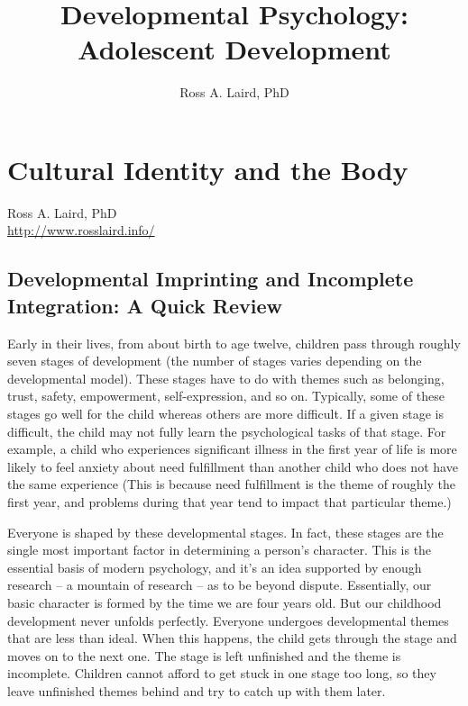 \documentclass[12pt,DIV9,oneside,headsepline,footsepline]{scrreprt}
\title{Developmental Psychology:\\Adolescent Development}
\author{Ross A. Laird, PhD}
\begin{document}

\pagestyle{empty}
\begin{center}
\maketitle
\end{center}
\tableofcontents
\pagestyle{scrheadings}
\chapter{Cultural Identity and the Body}
\begin{flushleft}
Ross A. Laird, PhD\\
\url{http://www.rosslaird.info/}
\end{flushleft}

\section{Developmental Imprinting and Incomplete Integration: A Quick
Review}

Early in their lives, from about birth to age twelve, children pass
through roughly seven stages of development (the number of stages
varies depending on the developmental model). These stages have to do
with themes such as belonging, trust, safety, empowerment,
self-expression, and so on. Typically, some of these stages go well
for the child whereas others are more difficult. If a given stage is
difficult, the child may not fully learn the psychological tasks of
that stage. For example, a child who experiences significant illness
in the first year of life is more likely to feel anxiety about need
fulfillment than another child who does not have the same experience
(This is because need fulfillment is the theme of roughly the first
year, and problems during that year tend to impact that particular
theme.)


Everyone is shaped by these developmental stages. In fact, these
stages are the single most important factor in determining a person's
character. This is the essential basis of modern psychology, and it's
an idea supported by enough research -- a mountain of research -- as
to be beyond dispute. Essentially, our basic character is formed by
the time we are four years old. But our childhood development never
unfolds perfectly. Everyone undergoes developmental themes that are
less than ideal. When this happens, the child gets through the stage
and moves on to the next one. The stage is left unfinished and the
theme is incomplete. Children cannot afford to get stuck in one stage
too long, so they leave unfinished themes behind and try to catch up
with them later. 
\end{document}
